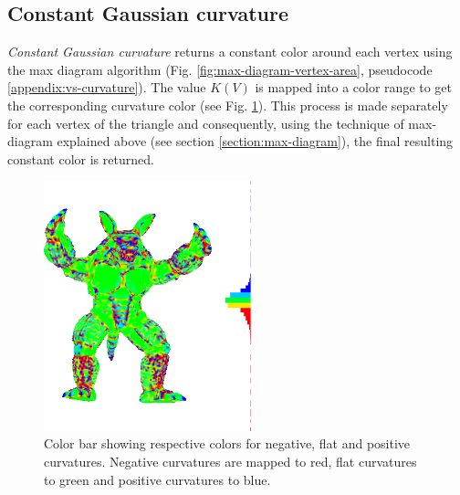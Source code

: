 \subsection{Constant Gaussian curvature}
\label{section:gc-curvature}
\textit{Constant Gaussian curvature} returns a constant color around each vertex using the max diagram algorithm (Fig. \ref{fig:max-diagram-vertex-area}, pseudocode \ref{appendix:vs-curvature}). The value $K(V)$ is mapped into a color range to get the corresponding curvature color (see Fig. \ref{fig:color-range-curvature}). This process is made separately for each vertex of the triangle and consequently, using the technique of max-diagram explained above (see section \ref{section:max-diagram}), the final resulting constant color is returned.
\begin{figure}[!h]
    \centering
    \includegraphics[width=6cm]{images/gradient-curvature.png}
    \caption{Color bar showing respective colors for negative, flat and positive curvatures. Negative curvatures are mapped to red, flat curvatures to green and positive curvatures to blue.} \label{fig:color-range-curvature}
\end{figure}


